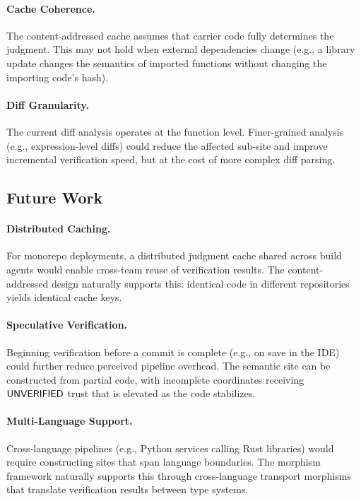 \documentclass[11pt]{article}
\begin{document}
\paragraph{Cache Coherence.}
The content-addressed cache assumes that carrier code fully determines the
judgment. This may not hold when external dependencies change (e.g., a
library update changes the semantics of imported functions without changing
the importing code's hash).

\paragraph{Diff Granularity.}
The current diff analysis operates at the function level. Finer-grained
analysis (e.g., expression-level diffs) could reduce the affected sub-site
and improve incremental verification speed, but at the cost of more complex
diff parsing.

\subsection{Future Work}

\paragraph{Distributed Caching.}
For monorepo deployments, a distributed judgment cache shared across build
agents would enable cross-team reuse of verification results. The
content-addressed design naturally supports this: identical code in
different repositories yields identical cache keys.

\paragraph{Speculative Verification.}
Beginning verification before a commit is complete (e.g., on save in the
IDE) could further reduce perceived pipeline overhead. The semantic site can
be constructed from partial code, with incomplete coordinates receiving
$\mathsf{UNVERIFIED}$ trust that is elevated as the code stabilizes.

\paragraph{Multi-Language Support.}
Cross-language pipelines (e.g., Python services calling Rust libraries)
would require constructing sites that span language boundaries. The morphism
framework naturally supports this through cross-language transport morphisms
that translate verification results between type systems.
\end{document}
